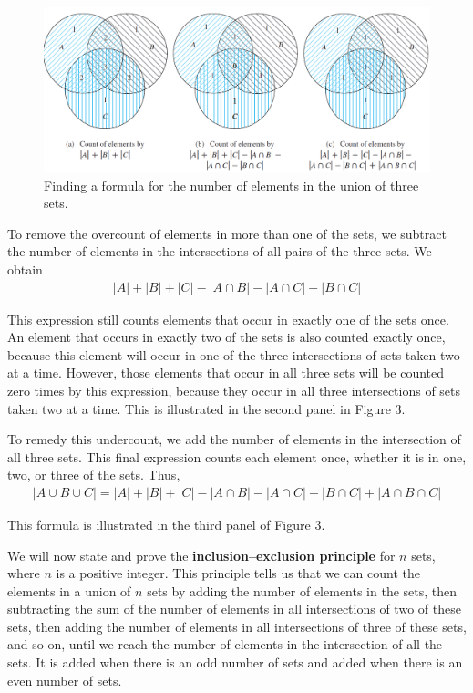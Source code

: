 \documentclass[11pt]{article}
\begin{document}
\begin{figure}[h!]
    \centering
    \includegraphics[width=.7\textwidth]{img/ch8.5-figure3.png}
    \caption{Finding a formula for the number of elements in the union of three sets.}
    \label{fig:my_label}
\end{figure}

To remove the overcount of elements in more than one of the sets, we subtract the number of elements in the intersections of all pairs of the three sets. We obtain
\begin{align*}
    |A| + |B| + |C| - |A \cap B| - |A \cap C| - |B \cap C|
\end{align*}

\noindent This expression still counts elements that occur in exactly one of the sets once. An element that occurs in exactly two of the sets is also counted exactly once, because this element will occur in one of the three intersections of sets taken two at a time. However, those elements that occur in all three sets will be counted zero times by this expression, because they occur in all three intersections of sets taken two at a time. This is illustrated in the second panel in Figure 3.

To remedy this undercount, we add the number of elements in the intersection of all three sets. This final expression counts each element once, whether it is in one, two, or three of the sets. Thus,
\begin{align*}
    |A \cup B \cup C| = |A| + |B| + |C| - |A \cap B| - |A \cap C| - |B \cap C| + |A \cap B \cap C|
\end{align*}

\noindent This formula is illustrated in the third panel of Figure 3.

We will now state and prove the \textbf{inclusion–exclusion principle} for $n$ sets, where $n$ is a positive integer. This principle tells us that we can count the elements in a union of $n$ sets by adding the number of elements in the sets, then subtracting the sum of the number of elements in all intersections of two of these sets, then adding the number of elements in all intersections of three of these sets, and so on, until we reach the number of elements in the intersection of all the sets. It is added when there is an odd number of sets and added when there is an even number of sets.
\end{document}
